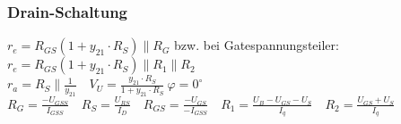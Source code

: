     \subsubsection{Drain-Schaltung}
        $r_e=R_{GS}(1+y_{21}\cdot R_S)\parallel R_G$ bzw. bei Gatespannungsteiler: $r_e=R_{GS}(1+y_{21}\cdot R_S)\parallel R_1\parallel R_2$ \\
        $r_a=R_S\parallel \frac{1}{y_{21}}\quad V_U=\frac{y_{21}\cdot R_S}{1+y_{21}\cdot R_S}\: \varphi=0^{\circ}$ \\ %
        $R_G=\frac{-U_{GSS}}{I_{GSS}}\quad
        R_S=\frac{U_{RS}}{I_D}\quad
        R_{GS}=\frac{-U_{GS}}{-I_{GSS}}\quad
        R_1=\frac{U_B-U_{GS}-U_S}{I_q}\quad
        R_2=\frac{U_{GS}+U_S}{I_q}$ %
